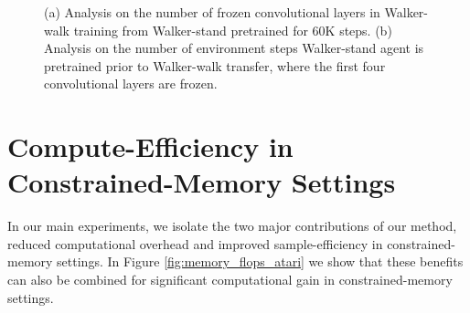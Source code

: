 \documentclass{article}
\begin{document}
\begin{figure} [t] \centering
{} 
\caption{(a) Analysis on the number of frozen convolutional layers in Walker-walk training from Walker-stand pretrained for 60K steps. (b) Analysis on the number of environment steps Walker-stand agent is pretrained prior to Walker-walk transfer, where the first four convolutional layers are frozen.} \label{fig:transfer_dmc_ablation}
\end{figure}














\section{Compute-Efficiency in Constrained-Memory Settings} \label{appendix:additional_figures1}
In our main experiments, we isolate the two major contributions of our method, reduced computational overhead and improved sample-efficiency in constrained-memory settings. In Figure \ref{fig:memory_flops_atari} we show that these benefits can also be combined for significant computational gain in constrained-memory settings. 

\begin{figure*} [t] \centering
{} 
\\
\caption{Comparison of Rainbow in constrained-memory settings with and without SEER, where the x-axis shows estimated cumulative FLOPs, corresponding to Figure \ref{fig:memory_atari}. The dotted gray line denotes the encoder freezing time $t=T_f$. The solid line and shaded regions represent the mean and standard deviation, respectively, across five runs.} \label{fig:memory_flops_atari}
\end{figure*}
\end{document}
